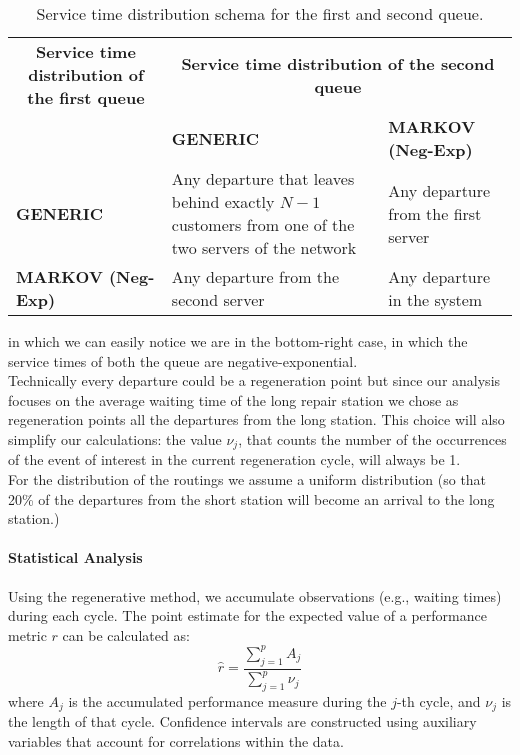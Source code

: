 \documentclass[12pt]{article}
\begin{document}
		\begin{table}[H]
			\centering
			\renewcommand{\arraystretch}{1.5}
			\begin{tabular}{|m{4cm}|m{4cm}|m{4cm}|}
				\hline
				\multicolumn{1}{|c|}{\textbf{Service time distribution of the first queue}} &
				\multicolumn{2}{c|}{\textbf{Service time distribution of the second queue}} \\ 
				\cline{2-3}
				& \textbf{GENERIC} & \textbf{MARKOV (Neg-Exp)} \\ 
				\hline
				\textbf{GENERIC} & Any departure that leaves behind exactly $N - 1$ customers from one of the two servers of the network & Any departure from the first server \\ 
				\hline
				\textbf{MARKOV (Neg-Exp)} & Any departure from the second server & Any departure in the system \\ 
				\hline
			\end{tabular}
			\caption{Service time distribution schema for the first and second queue.}
		\end{table}
	in which we can easily notice we are in the bottom-right case, in which the service times of both the queue are negative-exponential.\\
	Technically every departure could be a regeneration point but since our analysis focuses on the average waiting time of the long repair station we chose as regeneration points all the departures from the long station. 
	This choice will also simplify our calculations: the value $\nu_{j}$, that counts the number of the occurrences of the event of interest in the current regeneration cycle, will always be 1. \\
	For the distribution of the routings we assume a uniform distribution (so that 20\% of the departures from the short station will become an arrival to the long station.)
	
	\paragraph{Statistical Analysis}
	Using the regenerative method, we accumulate observations (e.g., waiting times) during each cycle. The point estimate for the expected value of a performance metric $r$ can be calculated as:
	\[
	\hat{r} = \frac{\sum_{j=1}^p A_j}{\sum_{j=1}^p \nu_j}
	\]
	where $A_j$ is the accumulated performance measure during the $j$-th cycle, and $\nu_j$ is the length of that cycle. Confidence intervals are constructed using auxiliary variables that account for correlations within the data.
	
\end{document}
